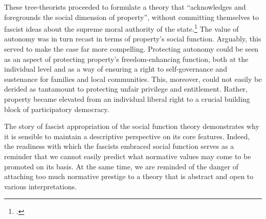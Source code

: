 
These tree-theorists proceeded to formulate a theory that ``acknowledges and foregrounds the social dimension of property'', without committing themselves to fascist ideas about the supreme moral authority of the state.\footcite[907]{robilant13} The value of autonomy was in turn recast in terms of property's social function. Arguably, this served to make the case far more compelling. Protecting autonomy could be seen as an aspect of protecting property's freedom-enhancing function, both at the individual level and as a way of ensuring a right to self-governance and sustenance for families and local communities. This, moreover, could not easily be derided as tantamount to protecting unfair privilege and entitlement. Rather, property became elevated from an individual liberal right to a crucial building block of participatory democracy.

The story of fascist appropriation of the social function theory demonstrates why it is sensible to maintain a descriptive perspective on its core features. Indeed, the readiness with which the fascists embraced social function  serves as a reminder that we cannot easily predict what normative values may come to be promoted on its basis. At the same time, we are reminded of the danger of attaching too much normative prestige to a theory that is abstract and open to various interpretations.

